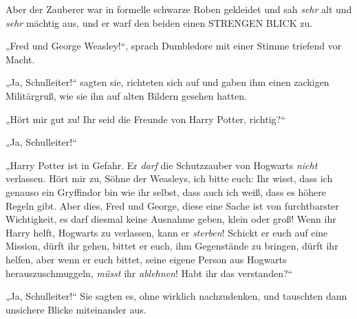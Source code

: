 Aber der Zauberer war in formelle schwarze Roben gekleidet und sah \emph{sehr} alt und \emph{sehr} mächtig aus, und er warf den beiden einen STRENGEN BLICK zu.

„Fred und George Weasley!“, sprach Dumbledore mit einer Stimme triefend vor Macht.

„Ja, Schulleiter!“ sagten sie, richteten sich auf und gaben ihm einen zackigen Militärgruß, wie sie ihn auf alten Bildern gesehen hatten.

„Hört mir gut zu! Ihr seid die Freunde von Harry Potter, richtig?“

„Ja, Schulleiter!“

„Harry Potter ist in Gefahr. Er \emph{darf} die Schutzzauber von Hogwarts \emph{nicht} verlassen. Hört mir zu, Söhne der Weasleys, ich bitte euch: Ihr wisst, dass ich genauso ein Gryffindor bin wie ihr selbst, dass auch ich weiß, dass es höhere Regeln gibt. Aber dies, Fred und George, diese eine Sache ist von furchtbarster Wichtigkeit, es darf diesmal keine Ausnahme geben, klein oder groß! Wenn ihr Harry helft, Hogwarts zu verlassen, kann er \emph{sterben}! Schickt er euch auf eine Mission, dürft ihr gehen, bittet er euch, ihm Gegenstände zu bringen, dürft ihr helfen, aber wenn er euch bittet, seine eigene Person aus Hogwarts herauszuschmuggeln, \emph{müsst} ihr \emph{ablehnen}! Habt ihr das verstanden?“

„Ja, Schulleiter!“ Sie sagten es, ohne wirklich nachzudenken, und tauschten dann unsichere Blicke miteinander aus.

